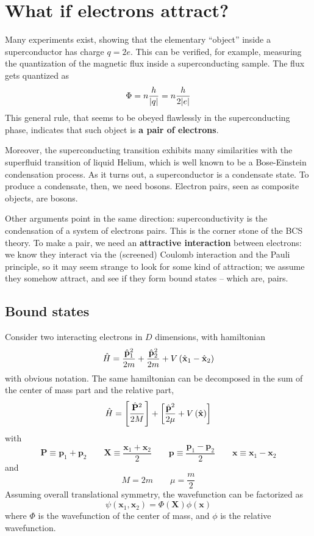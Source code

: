 \section{What if electrons attract?}

Many experiments exist, showing that the elementary ``object'' inside a superconductor has charge $q=2e$. This can be verified, for example, measuring the quantization of the magnetic flux inside a superconducting sample. The flux gets quantized as
\[
	\Phi = n\frac{h}{\abs{q}} = n \frac{h}{2\abs{e}} 
\]
This general rule, that seems to be obeyed flawlessly in the superconducting phase, indicates that such object is \textbf{a pair of electrons}.

Moreover, the superconducting transition exhibits many similarities with the superfluid transition of liquid Helium, which is well known to be a Bose-Einstein condensation process. As it turns out, a superconductor is a condensate state. To produce a condensate, then, we need bosons. Electron pairs, seen as composite objects, are bosons.

Other arguments point in the same direction: superconductivity is the condensation of a system of electrons pairs. This is the corner stone of the BCS theory. To make a pair, we need an \textbf{attractive interaction} between electrons: we know they interact via the (screened) Coulomb interaction and the Pauli principle, so it may seem strange to look for some kind of attraction; we assume they somehow attract, and see if they form bound states -- which are, pairs.

\subsection{Bound states}

Consider two interacting electrons in $D$ dimensions, with hamiltonian
\[
	\hat H = \frac{\hat{\mathbf{p}}_1^2}{2m} + \frac{\hat{\mathbf{p}}_2^2}{2m} + V\left({\hat{\mathbf{x}}_1-\hat{\mathbf{x}}_2}\right)
\]
with obvious notation. The same hamiltonian can be decomposed in the sum of the center of mass part and the relative part,
\[
	\hat H = \left[{\frac{\hat{\mathbf{P}}^2}{2M}}\right] + \left[{\frac{\hat{\mathbf{p}}^2}{2\mu} + V \left({\hat{\mathbf{x}}}\right)}\right]
\]
with
\[
	\mathbf{P} \equiv \mathbf{p}_1 + \mathbf{p}_2
	\qquad
	\mathbf{X} \equiv \frac{\mathbf{x}_1 + \mathbf{x}_2}{2}
	\qquad
	\mathbf{p} \equiv \frac{\mathbf{p}_1 - \mathbf{p}_2}{2}
	\qquad
	\mathbf{x} \equiv \mathbf{x}_1 - \mathbf{x}_2
\]
and
\[
	M = 2m
	\qquad
	\mu = \frac{m}{2}
\]
Assuming overall translational symmetry, the wavefunction can be factorized as
\[
	\psi(\mathbf{x}_1,\mathbf{x}_2) = \Phi(\mathbf{X}) \phi(\mathbf{x})
\]
where $\Phi$ is the wavefunction of the center of mass, and $\phi$ is the relative wavefunction.

